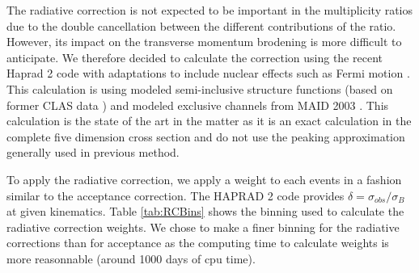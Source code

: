 The radiative correction is not expected to be important in the multiplicity 
ratios due to the double cancellation between the different contributions of 
the ratio. However, its impact on the transverse momentum brodening is more 
difficult to anticipate. We therefore decided to calculate the correction using 
the recent Haprad 2 code \cite{Akushevich:2007jc} with adaptations to include
nuclear effects such as Fermi motion \cite{Osipenko:PC}. This calculation is
using modeled semi-inclusive structure functions (based on former CLAS
data \cite{Akushevich:2007jc}) and modeled exclusive channels from MAID 2003
\cite{Drechsel:1998hk}. This calculation is the state of the art in the matter
as it is an exact calculation in the complete five dimension cross section
and do not use the peaking approximation generally used in previous method.

To apply the radiative correction, we apply a weight to each events in a fashion
similar to the acceptance correction. The HAPRAD 2 code provides 
$\delta = \sigma_{obs} / \sigma_B$ at given kinematics. Table \ref{tab:RCBins} 
shows the binning used to calculate the radiative correction weights.
We chose to make a finer 
binning for the radiative corrections than for acceptance as the computing time 
to calculate weights is more reasonnable (around 1000 days of cpu time). 

